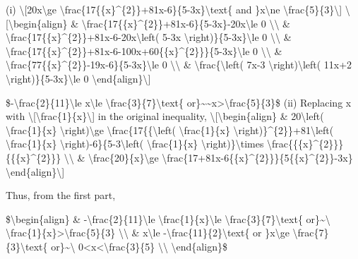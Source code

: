 \item (i) \textbackslash{[}20x\textbackslash ge \textbackslash frac\{17\{\{x\}\textasciicircum\{2\}\}+81x-6\}\{5-3x\}\textbackslash text\{
and \}x\textbackslash ne \textbackslash frac\{5\}\{3\}\textbackslash{]}
\textbackslash{[}\textbackslash begin\{align\} \& \textbackslash frac\{17\{\{x\}\textasciicircum\{2\}\}+81x-6\}\{5-3x\}-20x\textbackslash le
0 \textbackslash\textbackslash{} \& \textbackslash frac\{17\{\{x\}\textasciicircum\{2\}\}+81x-6-20x\textbackslash left(
5-3x \textbackslash right)\}\{5-3x\}\textbackslash le 0 \textbackslash\textbackslash{}
\& \textbackslash frac\{17\{\{x\}\textasciicircum\{2\}\}+81x-6-100x+60\{\{x\}\textasciicircum\{2\}\}\}\{5-3x\}\textbackslash le
0 \textbackslash\textbackslash{} \& \textbackslash frac\{77\{\{x\}\textasciicircum\{2\}\}-19x-6\}\{5-3x\}\textbackslash le
0 \textbackslash\textbackslash{} \& \textbackslash frac\{\textbackslash left(
7x-3 \textbackslash right)\textbackslash left( 11x+2 \textbackslash right)\}\{5-3x\}\textbackslash le
0 \textbackslash end\{align\}\textbackslash{]}

\$-\textbackslash frac\{2\}\{11\}\textbackslash le x\textbackslash le
\textbackslash frac\{3\}\{7\}\textbackslash text\{ or\}\textasciitilde\textasciitilde x>\textbackslash frac\{5\}\{3\}\$
(ii) Replacing x with \textbackslash{[}\textbackslash frac\{1\}\{x\}\textbackslash{]}
in the original inequality, \textbackslash{[}\textbackslash begin\{align\}
\& 20\textbackslash left( \textbackslash frac\{1\}\{x\} \textbackslash right)\textbackslash ge
\textbackslash frac\{17\{\{\textbackslash left( \textbackslash frac\{1\}\{x\}
\textbackslash right)\}\textasciicircum\{2\}\}+81\textbackslash left(
\textbackslash frac\{1\}\{x\} \textbackslash right)-6\}\{5-3\textbackslash left(
\textbackslash frac\{1\}\{x\} \textbackslash right)\}\textbackslash times
\textbackslash frac\{\{\{x\}\textasciicircum\{2\}\}\}\{\{\{x\}\textasciicircum\{2\}\}\}
\textbackslash\textbackslash{} \& \textbackslash frac\{20\}\{x\}\textbackslash ge
\textbackslash frac\{17+81x-6\{\{x\}\textasciicircum\{2\}\}\}\{5\{\{x\}\textasciicircum\{2\}\}-3x\}
\textbackslash end\{align\}\textbackslash{]} 

Thus, from the first part,

\$\textbackslash begin\{align\} \& -\textbackslash frac\{2\}\{11\}\textbackslash le
\textbackslash frac\{1\}\{x\}\textbackslash le \textbackslash frac\{3\}\{7\}\textbackslash text\{
or\}\textasciitilde\textbackslash{} \textbackslash frac\{1\}\{x\}>\textbackslash frac\{5\}\{3\}
\textbackslash\textbackslash{} \& x\textbackslash le -\textbackslash frac\{11\}\{2\}\textbackslash text\{
or \}x\textbackslash ge \textbackslash frac\{7\}\{3\}\textbackslash text\{
or\}\textasciitilde\textbackslash{} 0<x<\textbackslash frac\{3\}\{5\}
\textbackslash\textbackslash{} \textbackslash end\{align\}\$